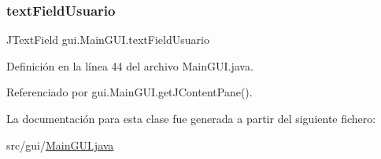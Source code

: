 \subsubsection{\texorpdfstring{textFieldUsuario}{textFieldUsuario}}
{\footnotesize\ttfamily J\+Text\+Field gui.\+Main\+G\+U\+I.\+text\+Field\+Usuario\hspace{0.3cm}{\ttfamily [private]}}



Definición en la línea 44 del archivo Main\+G\+U\+I.\+java.



Referenciado por gui.\+Main\+G\+U\+I.\+get\+J\+Content\+Pane().



La documentación para esta clase fue generada a partir del siguiente fichero\+:\begin{DoxyCompactItemize}
\item 
src/gui/\mbox{\hyperlink{MainGUI_8java}{Main\+G\+U\+I.\+java}}\end{DoxyCompactItemize}
